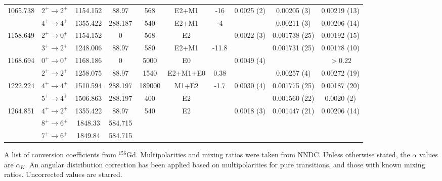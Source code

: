 \begin{landscape}
\begin{longtable}{c|c|c|c|c|c|c|c|c|c}
1065.738	&	$2^+	\rightarrow	2^+$	&	1154.152	&	88.97	&	568	&	E2+M1	&	-16	&	0.0025 (2)	&	0.00205 (3)	&	0.00219 (13)	\\
	&	$4^+	\rightarrow	4^+$	&	1355.422	&	288.187	&	540	&	E2+M1	&	-4	&		&	0.00211 (3)	&	0.00206 (14)	\\
1158.649	&	$2^+	\rightarrow	0^+$	&	1154.152	&	0	&	568	&	E2	&		&	0.0022 (3)	&	0.001738 (25)	&	0.00192 (15)	\\
	&	$3^+	\rightarrow	2^+$	&	1248.006	&	88.97	&	580	&	E2+M1	&	-11.8	&		&	0.001731 (25)	&	0.00178 (10)	\\
1168.694	&	$0^+	\rightarrow	0^+$	&	1168.186	&	0	&	5000	&	E0	&		&	0.0049 (4)	&		&	$>0.22$	\\
	&	$2^+	\rightarrow	2^+$	&	1258.075	&	88.97	&	1540	&	E2+M1+E0	&	0.38	&		&	0.00257 (4)	&	0.00272 (19)	\\
1222.224	&	$4^+	\rightarrow	4^+$	&	1510.594	&	288.197	&	189000	&	M1+E2	&	-1.7	&	0.0030 (4)	&	0.001775 (25)	&	0.00187 (20)	\\
	&	$5^+	\rightarrow	4^+$	&	1506.863	&	288.197	&	400	&	E2	&		&		&	0.001560 (22)	&	0.0020 (2)	\\
1264.851	&	$4^+	\rightarrow	2^+$	&	1355.422	&	88.97	&	540	&	E2	&		&	0.0018 (3)	&	0.001447 (21)	&	0.00206 (14)	\\
	&	$8^+	\rightarrow	6^+$	&	1848.33	&	584.715	&		&		&		&		&		&		\\
	&	$7^+	\rightarrow	6^+$	&	1849.84	&	584.715	&		&		&		&		&		&		\\ \bottomrule
    \end{longtable}
    \caption{A list of conversion coefficients from $^{156}$Gd. Multipolarities and mixing ratios were taken from NNDC. Unless otherwise stated, the $\alpha$ values are $\alpha_K$. An angular distribution correction has been applied based on multipolarities for pure transitions, and those with known mixing ratios. Uncorrected values are starred.}
\end{landscape}